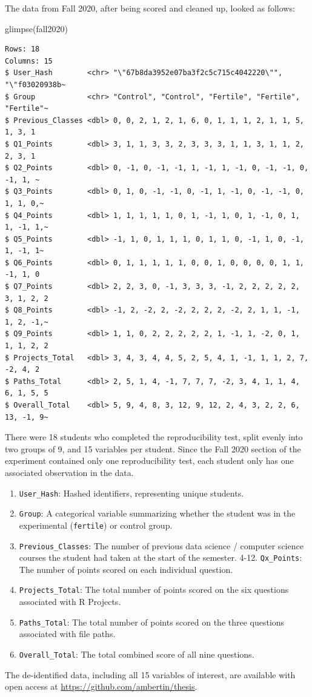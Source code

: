 \documentclass[12pt,twoside]{reedthesis}
\newenvironment{Shaded}{\begin{snugshade}}{\end{snugshade}}
\newcommand{\FunctionTok}[1]{\textcolor[rgb]{0.00,0.00,0.00}{#1}}
\newcommand{\NormalTok}[1]{#1}
\providecommand{\tightlist}{%
  \setlength{\itemsep}{0pt}\setlength{\parskip}{0pt}}
\begin{document}
The data from Fall 2020, after being scored and cleaned up, looked as follows:
\begin{Shaded}
\begin{Highlighting}[]
\FunctionTok{glimpse}\NormalTok{(fall2020)}
\end{Highlighting}
\end{Shaded}
\small
\begin{verbatim}
Rows: 18
Columns: 15
$ User_Hash        <chr> "\"67b8da3952e07ba3f2c5c715c4042220\"", "\"f03020938b~
$ Group            <chr> "Control", "Control", "Fertile", "Fertile", "Fertile"~
$ Previous_Classes <dbl> 0, 0, 2, 1, 2, 1, 6, 0, 1, 1, 1, 2, 1, 1, 5, 1, 3, 1
$ Q1_Points        <dbl> 3, 1, 1, 3, 3, 2, 3, 3, 3, 1, 1, 3, 1, 1, 2, 2, 3, 1
$ Q2_Points        <dbl> 0, -1, 0, -1, -1, 1, -1, 1, -1, 0, -1, -1, 0, -1, 1, ~
$ Q3_Points        <dbl> 0, 1, 0, -1, -1, 0, -1, 1, -1, 0, -1, -1, 0, 1, 1, 0,~
$ Q4_Points        <dbl> 1, 1, 1, 1, 1, 0, 1, -1, 1, 0, 1, -1, 0, 1, 1, -1, 1,~
$ Q5_Points        <dbl> -1, 1, 0, 1, 1, 1, 0, 1, 1, 0, -1, 1, 0, -1, 1, -1, 1~
$ Q6_Points        <dbl> 0, 1, 1, 1, 1, 1, 0, 0, 1, 0, 0, 0, 0, 1, 1, -1, 1, 0
$ Q7_Points        <dbl> 2, 2, 3, 0, -1, 3, 3, 3, -1, 2, 2, 2, 2, 2, 3, 1, 2, 2
$ Q8_Points        <dbl> -1, 2, -2, 2, -2, 2, 2, 2, -2, 2, 1, 1, -1, 1, 2, -1,~
$ Q9_Points        <dbl> 1, 1, 0, 2, 2, 2, 2, 2, 1, -1, 1, -2, 0, 1, 1, 1, 2, 2
$ Projects_Total   <dbl> 3, 4, 3, 4, 4, 5, 2, 5, 4, 1, -1, 1, 1, 2, 7, -2, 4, 2
$ Paths_Total      <dbl> 2, 5, 1, 4, -1, 7, 7, 7, -2, 3, 4, 1, 1, 4, 6, 1, 5, 5
$ Overall_Total    <dbl> 5, 9, 4, 8, 3, 12, 9, 12, 2, 4, 3, 2, 2, 6, 13, -1, 9~
\end{verbatim}
\normalsize

There were 18 students who completed the reproducibility test, split evenly into two groups of 9, and 15 variables per student. Since the Fall 2020 section of the experiment contained only one reproducibility test, each student only has one associated observation in the data.
\begin{enumerate}
\def\labelenumi{\arabic{enumi}.}
\tightlist
\item
  \texttt{User\_Hash}: Hashed identifiers, representing unique students.
\item
  \texttt{Group}: A categorical variable summarizing whether the student was in the experimental (\texttt{fertile}) or control group.
\item
  \texttt{Previous\_Classes}: The number of previous data science / computer science courses the student had taken at the start of the semester.
  4-12. \texttt{Qx\_Points}: The number of points scored on each individual question.
\item
  \texttt{Projects\_Total}: The total number of points scored on the six questions associated with R Projects.
\item
  \texttt{Paths\_Total}: The total number of points scored on the three questions associated with file paths.
\item
  \texttt{Overall\_Total}: The total combined score of all nine questions.
\end{enumerate}
The de-identified data, including all 15 variables of interest, are available with open access at \url{https://github.com/ambertin/thesis}.
\end{document}
